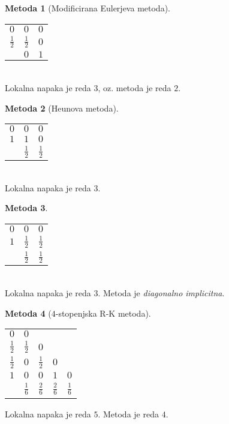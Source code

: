 \documentclass[11pt]{article}
\theoremstyle{definition}
\theoremstyle{definition}
\newtheorem*{metoda}{Metoda}
\begin{document}
\begin{metoda}[Modificirana Eulerjeva metoda]
~\\
\begin{tabular}{c|cc}
$0$ & $0$ & $0$ \\
$\frac{1}{2}$ & $\frac{1}{2}$ & $0$ \\[1ex] \hline
$~$ & $0$ & $1$ 
\end{tabular} \\
Lokalna napaka je reda $3$, oz. metoda je reda $2$.

\end{metoda}
\vspace{0.5cm}
\begin{metoda}[Heunova metoda]
~\\
\begin{tabular}{c|cc}
$0$ & $0$ & $0$ \\
$1$ & $1$ & $0$ \\[1ex] \hline
$~$ & $\frac{1}{2}$ & $\frac{1}{2}$ 
\end{tabular} \\
Lokalna napaka je reda $3$.

\end{metoda}
\vspace{0.5cm}

\begin{metoda}
~\\
\begin{tabular}{c|cc}
$0$ & $0$ & $0$ \\
$1$ & $\frac{1}{2}$ & $\frac{1}{2}$ \\[1ex] \hline
$~$ & $\frac{1}{2}$ & $\frac{1}{2}$ 
\end{tabular} \\
Lokalna napaka je reda $3$. Metoda je \textit{diagonalno implicitna}.

\end{metoda}
\vspace{0.5cm}

\begin{metoda}[$4$-stopenjska R-K metoda]
~\\
\begin{tabular}{c|cccc}
$0$ & $0$ & $~$ & $~$ & $~$ \\
$\frac{1}{2}$ & $\frac{1}{2}$ & $0$ & $~$ & $~$ \\[1ex]
$\frac{1}{2}$ & $0$ & $\frac{1}{2}$ & $0$ & $~$ \\[1ex] 
$1$ & $0$ & $0$ & $1$ & $0$ \\ \hline
~ & $\frac{1}{6}$ & $\frac{2}{6}$ & $\frac{2}{6}$ & $\frac{1}{6}$
\end{tabular}
Lokalna napaka je reda $5$. Metoda je reda $4$.

\end{metoda}
\vspace{0.5cm}
\end{document}
